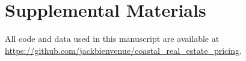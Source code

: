 \documentclass[12pt]{article}
\begin{document}
\section*{Supplemental Materials}

All code and data used in this manuscript are available at \url{https://github.com/jackbienvenue/coastal_real_estate_pricing}.


\newpage




\end{document}
